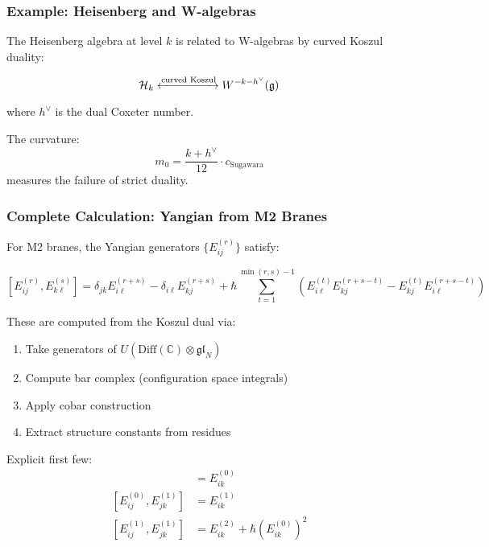 \subsubsection{Example: Heisenberg and W-algebras}

\begin{example}
The Heisenberg algebra at level $k$ is related to W-algebras by curved Koszul duality:

$$\mathcal{H}_k \xleftrightarrow{\text{curved Koszul}} W^{-k-h^\vee}(\mathfrak{g})$$

where $h^\vee$ is the dual Coxeter number.

The curvature:
$$m_0 = \frac{k + h^\vee}{12} \cdot c_{\text{Sugawara}}$$
measures the failure of strict duality.
\end{example}

\subsubsection{Complete Calculation: Yangian from M2 Branes}

\begin{calculation}
For M2 branes, the Yangian generators $\{E_{ij}^{(r)}\}$ satisfy:

$$[E_{ij}^{(r)}, E_{k\ell}^{(s)}] = \delta_{jk}E_{i\ell}^{(r+s)} - \delta_{i\ell}E_{kj}^{(r+s)} + \hbar \sum_{t=1}^{\min(r,s)-1} \left(E_{i\ell}^{(t)}E_{kj}^{(r+s-t)} - E_{kj}^{(t)}E_{i\ell}^{(r+s-t)}\right)$$

These are computed from the Koszul dual via:
\begin{enumerate}
\item Take generators of $U(\text{Diff}(\mathbb{C}) \otimes \mathfrak{gl}_N)$
\item Compute bar complex (configuration space integrals)
\item Apply cobar construction
\item Extract structure constants from residues
\end{enumerate}

Explicit first few:
\begin{align}
[E_{ij}^{(0)}, E_{jk}^{(0)}] &= E_{ik}^{(0)} \\
[E_{ij}^{(0)}, E_{jk}^{(1)}] &= E_{ik}^{(1)} \\
[E_{ij}^{(1)}, E_{jk}^{(1)}] &= E_{ik}^{(2)} + \hbar(E_{ik}^{(0)})^2
\end{align}
\end{calculation}

